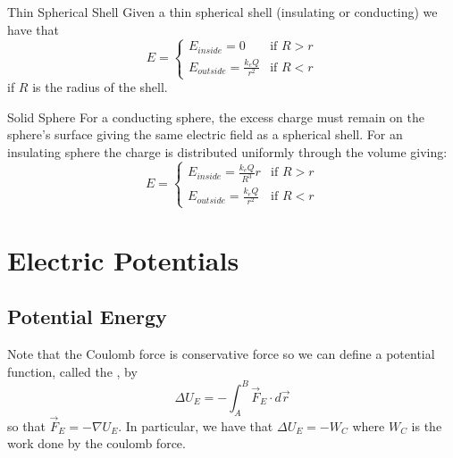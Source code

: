 \documentclass[12pt]{report}
\begin{document}
\begin{prop}{Thin Spherical Shell}{}
        Given a thin spherical shell (insulating or conducting) we have that \begin{equation}
                E = \left\{\begin{array}{ll} E_{inside} = 0 &\text{if $R > r$} \\ E_{outside} = \frac{k_eQ}{r^2} & \text{if $R < r$} \end{array}\right.
        \end{equation}
        if $R$ is the radius of the shell.
\end{prop}


\begin{prop}{Solid Sphere}{}
        For a conducting sphere, the excess charge must remain on the sphere's surface giving the same electric field as a spherical shell. For an insulating sphere the charge is distributed uniformly through the volume giving: \begin{equation}
                E = \left\{\begin{array}{ll} E_{inside} = \frac{k_eQ}{R^3}r &\text{if $R > r$} \\ E_{outside} = \frac{k_eQ}{r^2} & \text{if $R < r$} \end{array}\right.
        \end{equation}
\end{prop}






\chapter{Electric Potentials}

\section{Potential Energy}

\begin{defn}{}{}
        Note that the Coulomb force is conservative force so we can define a potential function, called the , by \begin{equation}
                \Delta U_E = -\int_A^B\vec{F}_E \cdot d\vec{r}
        \end{equation}
        so that $\vec{F}_E = -\nabla U_E$. In particular, we have that $\Delta U_E = -W_C$ where $W_C$ is the work done by the coulomb force.
\end{defn}
\end{document}
